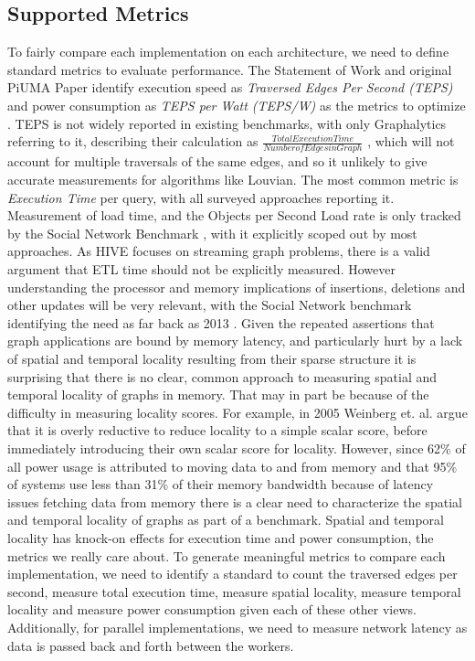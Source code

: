 \documentclass[letterpaper, 10pt]{article}
\begin{document}
\begin{multicols}{2}
        \subsection{Supported Metrics}\label{section:metrics}
        To fairly compare each implementation on each architecture, we need to define standard metrics to evaluate performance. 
        The Statement of Work and original PiUMA Paper identify execution speed as \textit{Traversed Edges Per Second (TEPS)} and power consumption as \textit{TEPS per Watt (TEPS/W)} as the metrics to optimize \cite{Aananthakrishnan2020}. 
        TEPS is not widely reported in existing benchmarks, with only Graphalytics referring to it, describing their calculation as $\frac{Total Execution Time}{Number of Edges in Graph}$ \cite{Capota2015}, which will not account for multiple traversals of the same edges, and so it unlikely to give accurate measurements for algorithms like Louvian.
        The most common metric is \textit{Execution Time} per query, with all surveyed approaches reporting it. 
        Measurement of load time, and the Objects per Second Load rate is only tracked by the Social Network Benchmark \cite{Angles2013}, with it explicitly scoped out by most approaches. 
        As HIVE focuses on streaming graph problems, there is a valid argument that ETL time should not be explicitly measured. 
        However understanding the processor and memory implications of insertions, deletions and other updates will be very relevant, with the Social Network benchmark identifying the need as far back as 2013 \cite{Angles2013}.
        Given the repeated assertions that graph applications are bound by memory latency, and particularly hurt by a lack of spatial and temporal locality resulting from their sparse structure \cite{Mutlu2023,Ren2010,Blondel2008,Capota2015,Beamer2017} it is surprising that there is no clear, common approach to measuring spatial and temporal locality of graphs in memory.
        That may in part be because of the difficulty in measuring locality scores. For example, in 2005 Weinberg et. al. argue that it is overly reductive to reduce locality to a simple scalar score, before immediately introducing their own scalar score for locality.
        However, since 62\% of all power usage is attributed to moving data to and from memory \cite{Mutlu2023} and that 95\% of systems use less than 31\% of their memory bandwidth \cite{Kanev2015} because of latency issues fetching data from memory there is a clear need to characterize the spatial and temporal locality of graphs as part of a benchmark. 
        Spatial and temporal locality has knock-on effects for execution time and power consumption, the metrics we really care about.
        To generate meaningful metrics to compare each implementation, we need to identify a standard to count the traversed edges per second, measure total execution time, measure spatial locality, measure temporal locality and measure power consumption given each of these other views.
        Additionally, for parallel implementations, we need to measure network latency as data is passed back and forth between the workers. 


\end{multicols}
\end{document}
